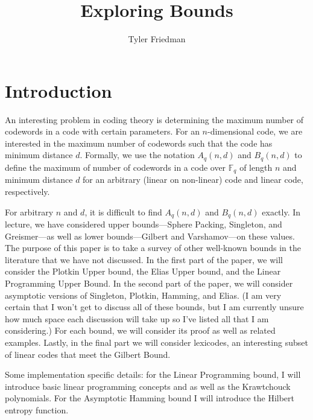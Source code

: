 \documentclass{article}
\title{Exploring Bounds}
\author{Tyler Friedman}
\numberwithin{theorem}{subsection}
\theoremstyle{definition}
\numberwithin{exmp}{subsection}
\theoremstyle{definition}
\numberwithin{defn}{subsection}
\theoremstyle{definition}
\numberwithin{claim}{subsection}
\begin{document}
\maketitle

\section{Introduction}

An interesting problem in coding theory is determining the maximum
number of codewords in a code with certain parameters.  For an $n$-dimensional code, we are interested in 
the maximum number of codewords such that the code has minimum distance $d$.  
Formally, we use the notation $A_q(n,d)$
and $B_q(n,d)$ to define the maximum of number of codewords in a code over
$\mathbb{F}_q$ of length $n$ and minimum distance $d$ for an arbitrary (linear
on non-linear) code and linear code, respectively.  

For arbitrary $n$ and $d$, it is difficult to find $A_q(n,d)$ and $B_q(n,d)$ exactly.
 In lecture, we have considered upper bounds---Sphere Packing, Singleton, and Greismer---as well as
lower bounds---Gilbert and Varshamov---on these values.  The purpose of this
paper is to take a survey of other well-known bounds in the literature that we have not discussed.  
In the first part of the paper, we will consider the Plotkin Upper bound, 
the Elias Upper bound, and the Linear Programming Upper Bound.  In the second part of the paper, we will consider asymptotic versions
of Singleton, Plotkin, Hamming, and Elias.  (I am very certain that I won't get to discuss all of these bounds, but I am currently unsure how much space each discussion will take up so I've
listed all that I am considering.)  For each bound, we will consider its proof as well
as related examples.  Lastly, in the final part we will consider lexicodes, an interesting subset of linear codes that meet the Gilbert Bound.

Some implementation specific details: for the Linear Programming bound, I will introduce basic linear programming concepts and as well as the Krawtchouck polynomials.  For the 
Asymptotic Hamming bound I will introduce the Hilbert entropy function.  
\end{document}
